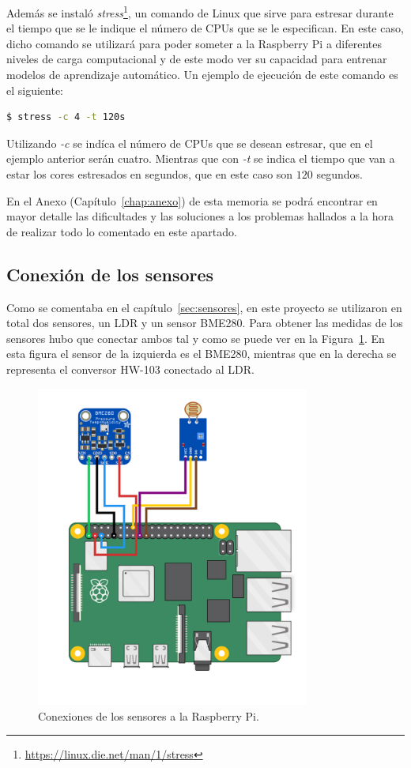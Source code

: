 \documentclass[a4paper, 12pt]{book}
\begin{document}
Además se instaló \textit{stress}\footnote{\url{https://linux.die.net/man/1/stress}}, un comando de Linux que sirve para estresar durante el tiempo que se le indique el número de CPUs que se le especifican. En este caso, dicho comando se utilizará para poder someter a la Raspberry Pi a diferentes niveles de carga computacional y de este modo ver su capacidad para entrenar modelos de aprendizaje automático. Un ejemplo de ejecución de este comando es el siguiente:\\

\begin{lstlisting}[language=bash]
    $ stress -c 4 -t 120s
\end{lstlisting}

Utilizando \textit{-c} se indíca el número de CPUs que se desean estresar, que en el ejemplo anterior serán cuatro. Mientras que con \textit{-t} se indica el tiempo que van a estar los cores estresados en segundos, que en este caso son $120$ segundos.

En el Anexo (Capítulo~\ref{chap:anexo}) de esta memoria se podrá encontrar en mayor detalle las dificultades y las soluciones a los problemas hallados a la hora de realizar todo lo comentado en este apartado.


\subsection{Conexión de los sensores}
\label{subsec:conexion_sensores}

Como se comentaba en el capítulo~\ref{sec:sensores}, en este proyecto se utilizaron en total dos sensores, un LDR y un sensor BME280. Para obtener las medidas de los sensores hubo que conectar ambos tal y como se puede ver en la Figura~\ref{fig:circuito}. En esta figura el sensor de la izquierda es el BME280, mientras que en la derecha se representa el conversor HW-103 conectado al LDR.

\begin{figure}[htb]
  \centering
  \includegraphics[width=9cm, keepaspectratio]{img/circuito.png}
  \caption{Conexiones de los sensores a la Raspberry Pi.}\label{fig:circuito}
\end{figure}
\end{document}
